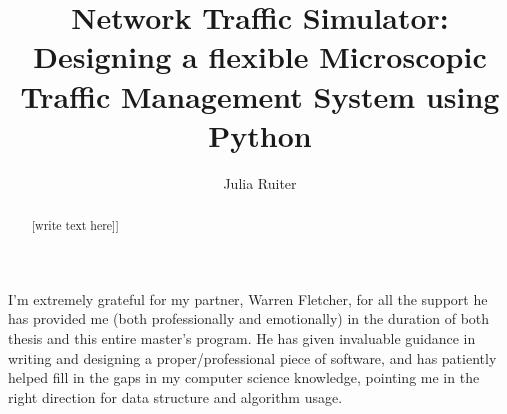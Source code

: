 \documentclass[a4paper,11pt,twoside]{UUthesis}
\title{Network Traffic Simulator:  \\ Designing a flexible  Microscopic Traffic Management System using Python}
\author{Julia Ruiter}
\theoremstyle{definition}
\theoremstyle{remark}
\begin{document}

\frontmatter

\maketitle %


\begin{abstract} 
[write text here]]
\end{abstract}

\begin{acknowledgments}
I'm extremely grateful for my partner, Warren Fletcher, for all the support he has provided me (both professionally and emotionally) in the duration of both thesis and this entire master's program. He has given invaluable guidance in writing and designing a proper/professional piece of software, and has patiently helped fill in the gaps in my computer science knowledge, pointing me in the right direction for data structure and algorithm usage.
\end{acknowledgments}

\tableofcontents
\listoffigures


\mainmatter







\backmatter

%
\nocite{*} %


\end{document}

